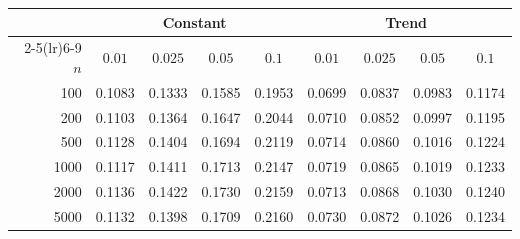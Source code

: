 \begin{tabular}{rcccccccc}
\toprule
& \multicolumn{4}{c}{Constant} & \multicolumn{4}{c}{Trend}\\
\cmidrule(lr){2-5}\cmidrule(lr){6-9}
$n$ & $0.01$ & $0.025$ & $0.05$ & $0.1$ & $0.01$ & $0.025$ & $0.05$ & $0.1$\\
\midrule
100 & 0.1083 & 0.1333 & 0.1585 & 0.1953 & 0.0699 & 0.0837 & 0.0983 & 0.1174 \\
200 & 0.1103 & 0.1364 & 0.1647 & 0.2044 & 0.0710 & 0.0852 & 0.0997 & 0.1195 \\
500 & 0.1128 & 0.1404 & 0.1694 & 0.2119 & 0.0714 & 0.0860 & 0.1016 & 0.1224 \\
1000 & 0.1117 & 0.1411 & 0.1713 & 0.2147 & 0.0719 & 0.0865 & 0.1019 & 0.1233 \\
2000 & 0.1136 & 0.1422 & 0.1730 & 0.2159 & 0.0713 & 0.0868 & 0.1030 & 0.1240 \\
5000 & 0.1132 & 0.1398 & 0.1709 & 0.2160 & 0.0730 & 0.0872 & 0.1026 & 0.1234 \\
\bottomrule
\end{tabular}
